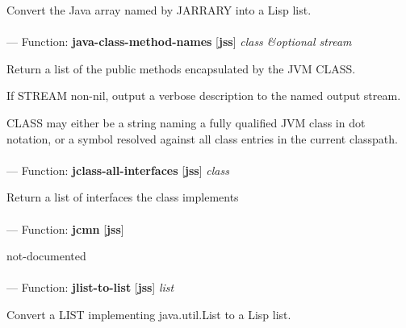 \begin{adjustwidth}{5em}{5em}
Convert the Java array named by JARRARY into a Lisp list.
\end{adjustwidth}

\paragraph{}
\label{JSS:JAVA-CLASS-METHOD-NAMES}
--- Function: \textbf{java-class-method-names} [\textbf{jss}] \textit{class \&optional stream}

\begin{adjustwidth}{5em}{5em}
Return a list of the public methods encapsulated by the JVM CLASS.

If STREAM non-nil, output a verbose description to the named output stream.

CLASS may either be a string naming a fully qualified JVM class in dot
notation, or a symbol resolved against all class entries in the
current classpath.
\end{adjustwidth}

\paragraph{}
\label{JSS:JCLASS-ALL-INTERFACES}
--- Function: \textbf{jclass-all-interfaces} [\textbf{jss}] \textit{class}

\begin{adjustwidth}{5em}{5em}
Return a list of interfaces the class implements
\end{adjustwidth}

\paragraph{}
\label{JSS:JCMN}
--- Function: \textbf{jcmn} [\textbf{jss}] \textit{}

\begin{adjustwidth}{5em}{5em}
not-documented
\end{adjustwidth}

\paragraph{}
\label{JSS:JLIST-TO-LIST}
--- Function: \textbf{jlist-to-list} [\textbf{jss}] \textit{list}

\begin{adjustwidth}{5em}{5em}
Convert a LIST implementing java.util.List to a Lisp list.
\end{adjustwidth}

